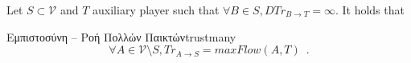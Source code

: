 {}
  Let $S \subset \mathcal{V}$ and $T$ auxiliary player such that $\forall B \in S, DTr_{B \rightarrow T} = \infty$.
  It holds that
\begin{theoremgr}{Εμπιστοσύνη -- Ροή Πολλών Παικτών}{trustmany} \ \\
  \begin{equation*}
    \forall A \in \mathcal{V} \setminus S, Tr_{A \rightarrow S} = maxFlow\left(A, T\right) \enspace.
  \end{equation*}
\end{theoremgr}       
